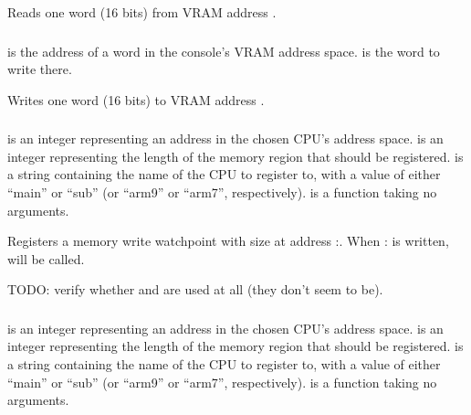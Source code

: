 \documentclass[letterpaper,10pt,english]{sphinxmanual}
\begin{document}
\sphinxAtStartPar
Reads one word (16 bits) from VRAM address .


\subsubsection{}
\label{\detokenize{mods:memory-vram-writeword-address-value}}\label{\detokenize{mods:vram-writeword}}
\sphinxAtStartPar
{} is the address of a word in the console’s VRAM address space.  is the word to write there.

\sphinxAtStartPar
Writes one word (16 bits) to VRAM address .


\subsubsection{}
\label{\detokenize{mods:memory-registerwrite-address-size-1-cpuname-main-func}}\label{\detokenize{mods:registerwrite}}
\sphinxAtStartPar
{} is an integer representing an address in the chosen CPU’s address space.  is an integer representing the length of the memory region that should be registered.  is a string containing the name of the CPU to register to, with a value of either “main” or “sub” (or “arm9” or “arm7”, respectively).  is a function taking no arguments.

\sphinxAtStartPar
Registers a memory write watchpoint with size  at address :. When : is written,  will be called.

\sphinxAtStartPar
TODO: verify whether  and  are used at all (they don’t seem to be).


\subsubsection{}
\label{\detokenize{mods:memory-registerread-address-size-1-cpuname-main-func}}\label{\detokenize{mods:registerread}}
\sphinxAtStartPar
{} is an integer representing an address in the chosen CPU’s address space.  is an integer representing the length of the memory region that should be registered.  is a string containing the name of the CPU to register to, with a value of either “main” or “sub” (or “arm9” or “arm7”, respectively).  is a function taking no arguments.
\end{document}
